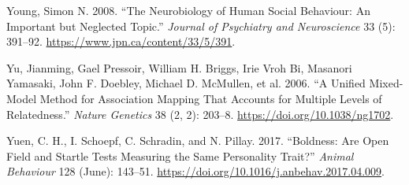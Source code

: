 \documentclass[
]{book}
\newlength{\cslhangindent}
\newlength{\cslentryspacingunit} %
\newenvironment{CSLReferences}[2] %
 {%
  \setlength{\parindent}{0pt}
  \ifodd #1
  \let\oldpar\par
  \def\par{\hangindent=\cslhangindent\oldpar}
  \fi
  \setlength{\parskip}{#2\cslentryspacingunit}
 }%
 {}
\begin{document}
\begin{CSLReferences}{1}{0}
\leavevmode{}%
Young, Simon N. 2008. {``The Neurobiology of Human Social Behaviour: An Important but Neglected Topic.''} \emph{Journal of Psychiatry and Neuroscience} 33 (5): 391--92. \url{https://www.jpn.ca/content/33/5/391}.

\leavevmode{}%
Yu, Jianming, Gael Pressoir, William H. Briggs, Irie Vroh Bi, Masanori Yamasaki, John F. Doebley, Michael D. McMullen, et al. 2006. {``A Unified Mixed-Model Method for Association Mapping That Accounts for Multiple Levels of Relatedness.''} \emph{Nature Genetics} 38 (2, 2): 203--8. \url{https://doi.org/10.1038/ng1702}.

\leavevmode{}%
Yuen, C. H., I. Schoepf, C. Schradin, and N. Pillay. 2017. {``Boldness: Are Open Field and Startle Tests Measuring the Same Personality Trait?''} \emph{Animal Behaviour} 128 (June): 143--51. \url{https://doi.org/10.1016/j.anbehav.2017.04.009}.

\end{CSLReferences}
\end{document}
